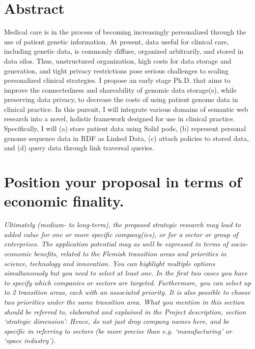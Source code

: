 
\section{Abstract}
    Medical care is in the process of becoming increasingly personalized through the use of patient genetic information. 
    At present, data useful for clinical care, including genetic data, is commonly diffuse, organized arbitrarily, and stored in data silos. 
    Thus, unstructured organization, high costs for data storage and generation, and tight privacy restrictions pose serious challenges to scaling personalized clinical strategies.
    I propose an early stage Ph.D. that aims to improve the connectedness and shareability of genomic data storage(s), while preserving data privacy, to decrease the costs of using patient genome data in clinical practice. 
    In this pursuit, I will integrate various domains of semantic web research into a novel, holistic framework designed for use in clinical practice.
    Specifically, I will (a) store patient data using Solid pods, (b) represent personal genome sequence data in RDF as Linked Data, (c) attach policies to stored data, and (d) query data through link traversal queries.




\section{Position your proposal in terms of economic finality.}
\textit{
Ultimately (medium- to long-term), the proposed strategic research may lead to added value for one or more specific company(ies), or for a sector or group of enterprises. 
The application potential may as well be expressed in terms of socio-economic benefits, related to the Flemish transition areas and priorities in science, technology and innovation. 
You can highlight multiple options simultaneously but you need to select at least one. 
In the first two cases you have to specify which companies or sectors are targeted. Furthermore, you can select up to 2 transition areas, each with an associated priority. It is also possible to choose two priorities under the same transition area. What you mention in this section should be referred to, elaborated and explained in the Project description, section ‘strategic dimension’: Hence, do not just drop company names here, and be specific in referring to sectors (be more precise than e.g. ‘manufacturing’ or ‘space industry’).
}

